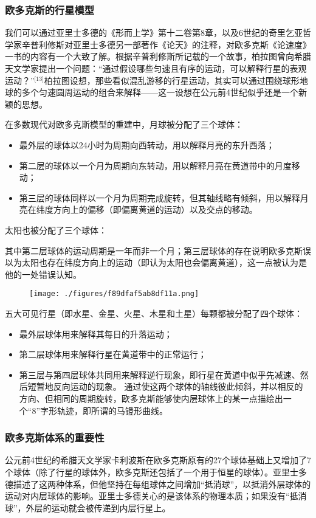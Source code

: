 \subsubsection{欧多克斯的行星模型}
我们可以通过亚里士多德的《形而上学》第十二卷第8章，以及6世纪的奇里乞亚哲学家辛普利修斯对亚里士多德另一部著作《论天》的注释，对欧多克斯《论速度》一书的内容有一个大致了解。根据辛普利修斯所记载的一个故事，柏拉图曾向希腊天文学家提出一个问题：“通过假设哪些匀速且有序的运动，可以解释行星的表观运动？”\(^\text{[13]}\)柏拉图设想，那些看似混乱游移的行星运动，其实可以通过围绕球形地球的多个匀速圆周运动的组合来解释——这一设想在公元前4世纪似乎还是一个新颖的思想。

在多数现代对欧多克斯模型的重建中，月球被分配了三个球体：
\begin{itemize}
\item 最外层的球体以24小时为周期向西转动，用以解释月亮的东升西落；
\item 第二层的球体以一个月为周期向东转动，用以解释月亮在黄道带中的月度移动；
\item 第三层的球体同样以一个月为周期完成旋转，但其轴线略有倾斜，用以解释月亮在纬度方向上的偏移（即偏离黄道的运动）以及交点的移动。
\end{itemize}
太阳也被分配了三个球体：

其中第二层球体的运动周期是一年而非一个月；第三层球体的存在说明欧多克斯误以为太阳也存在纬度方向上的运动（即认为太阳也会偏离黄道），这一点被认为是他的一处错误认知。
\begin{figure}[ht]
\centering
\texttt{[image: ./figures/f89dfaf5ab8df11a.png]}
\caption{} \label{fig_ODK_1}
\end{figure}
五大可见行星（即水星、金星、火星、木星和土星）每颗都被分配了四个球体：
\begin{itemize}
\item 最外层球体用来解释其每日的升落运动；
\item 第二层球体用来解释行星在黄道带中的正常运行；
\item 第三层与第四层球体共同用来解释逆行现象，即行星在黄道中似乎先减速、然后短暂地反向运动的现象。
通过使这两个球体的轴线彼此倾斜，并以相反的方向、但相同的周期旋转，欧多克斯能够使内层球体上的某一点描绘出一个“8”字形轨迹，即所谓的马镫形曲线。
\end{itemize}
\subsubsection{欧多克斯体系的重要性}
公元前4世纪的希腊天文学家卡利波斯在欧多克斯原有的27个球体基础上又增加了7个球体（除了行星的球体外，欧多克斯还包括了一个用于恒星的球体）。亚里士多德描述了这两种体系，但他坚持在每组球体之间增加“抵消球”，以抵消外层球体的运动对内层球体的影响。亚里士多德关心的是该体系的物理本质；如果没有“抵消球”，外层的运动就会被传递到内层行星上。

